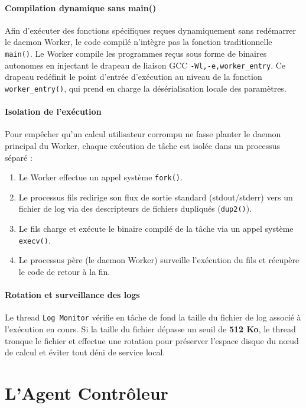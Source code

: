\documentclass[12pt,a4paper]{report}
\begin{document}
\paragraph{Compilation dynamique sans main()}
Afin d'exécuter des fonctions spécifiques reçues dynamiquement sans redémarrer le daemon Worker, le code compilé n'intègre pas la fonction traditionnelle \texttt{main()}. Le Worker compile les programmes reçus sous forme de binaires autonomes en injectant le drapeau de liaison GCC \texttt{-Wl,-e,worker\_entry}. Ce drapeau redéfinit le point d'entrée d'exécution au niveau de la fonction \texttt{worker\_entry()}, qui prend en charge la désérialisation locale des paramètres.

\paragraph{Isolation de l'exécution}
Pour empêcher qu'un calcul utilisateur corrompu ne fasse planter le daemon principal du Worker, chaque exécution de tâche est isolée dans un processus séparé :
\begin{enumerate}
    \item Le Worker effectue un appel système \texttt{fork()}.
    \item Le processus fils redirige son flux de sortie standard (stdout/stderr) vers un fichier de log via des descripteurs de fichiers dupliqués (\texttt{dup2()}).
    \item Le fils charge et exécute le binaire compilé de la tâche via un appel système \texttt{execv()}.
    \item Le processus père (le daemon Worker) surveille l'exécution du fils et récupère le code de retour à la fin.
\end{enumerate}

\paragraph{Rotation et surveillance des logs}
Le thread \texttt{Log Monitor} vérifie en tâche de fond la taille du fichier de log associé à l'exécution en cours. Si la taille du fichier dépasse un seuil de \textbf{512 Ko}, le thread tronque le fichier et effectue une rotation pour préserver l'espace disque du nœud de calcul et éviter tout déni de service local.

\section{L'Agent Contrôleur}
\end{document}
